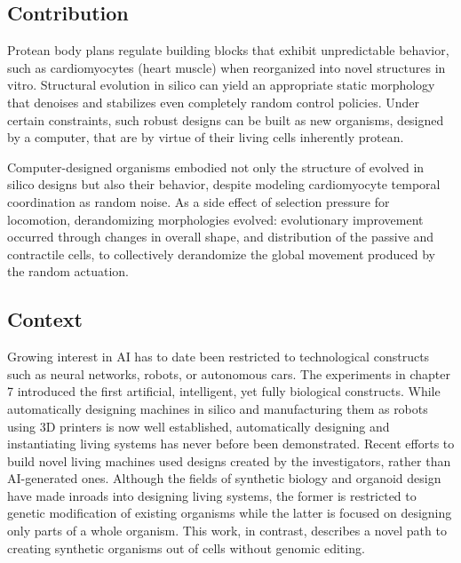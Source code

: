 \subsection{Contribution}

Protean body plans regulate building blocks that exhibit unpredictable behavior, such as cardiomyocytes (heart muscle) when reorganized into novel structures in vitro.
Structural evolution in silico can yield an appropriate static morphology that denoises and stabilizes even completely random control policies.
Under certain constraints, such robust designs can be built as new organisms, designed by a computer, that are by virtue of their living cells inherently protean.

Computer-designed organisms embodied not only the structure of evolved in silico designs but also their behavior, despite modeling cardiomyocyte temporal coordination as random noise. 
As a side effect of selection pressure for locomotion, derandomizing morphologies evolved: evolutionary improvement occurred through changes in overall shape, and distribution of the passive and contractile cells, to collectively derandomize the global movement produced by the random actuation. 


\subsection{Context}

Growing interest in AI has to date been restricted to technological constructs such as neural networks, robots, or autonomous cars. 
The experiments in chapter 7
introduced the first artificial, intelligent, yet fully biological constructs. 
While automatically designing machines in silico and manufacturing them as robots using 3D printers is now well established, automatically designing and instantiating living systems has never before been demonstrated. 
Recent efforts to build novel living machines \cite{herr2004swimming,xi2005self,feinberg2007muscular,cvetkovic2014three,raman2016optogenetic,nawroth2012tissue,park2016phototactic,ricotti2017biohybrid} used designs created by the investigators, rather than AI-generated ones.
Although the fields of synthetic biology and organoid design have made inroads into designing living systems, the former is restricted to genetic modification of existing organisms while the latter is focused on designing only parts of a whole organism.
This work, in contrast, describes a novel path to creating synthetic organisms out of cells without genomic editing.


